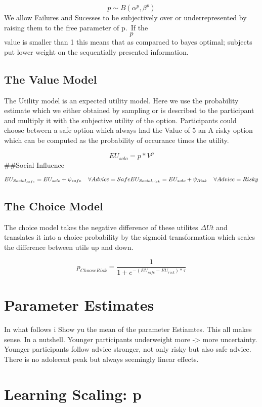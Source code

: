 \documentclass[]{article}
\begin{document}
\[ 
p \sim B(\alpha^{p},\beta^{p})
\] We allow Failures and Sucesses to be subjectively over or
underrepresented by raising them to the free parameter of p.~If the
\[p\] value is smaller than 1 this means that as comparaed to bayes
optimal; subjects put lower weight on the sequentially presented
information.

\subsection{The Value Model}\label{the-value-model}

The Utility model is an expected utility model. Here we use the
probability estimate which we either obtained by sampling or is
described to the participant and multiply it with the subjective utility
of the option. Participants could choose between a safe option which
always had the Value of 5 an A risky option which can be computed as the
probability of occurance times the utility.

\[ 
EU_{solo}=p*V^\rho
\] \#\#Social Influence

\[
EU_{Social_{safe}}=EU_{solo}+\psi_{safe} \;\;\;\;  \forall Advice = Safe \\
EU_{Social_{risk}}=EU_{solo}+\psi_{Risk} \;\;\;\; \forall Advice = Risky
\]

\subsection{The Choice Model}\label{the-choice-model}

The choice model takes the negative difference of these utilites
\(\Delta Ut\) and translates it into a choice probability by the sigmoid
transformation which scales the difference between utils up and down.

\[
p_{ChooseRisk}=\frac{1}{1+e^{- (EU_{safe}-EU_{risk})*\tau}}
\]

\section{Parameter Estimates}\label{parameter-estimates}

In what follows i Show yu the mean of the parameter Estiamtes. This all
makes sense. In a nutshell. Younger participants underweight more
-\textgreater{} more uncertainty. Younger participants follow advice
stronger, not only risky but also safe advice. There is no adolecent
peak but always seemingly linear effects.

\section{Learning Scaling: p}\label{learning-scaling-p}
\end{document}
